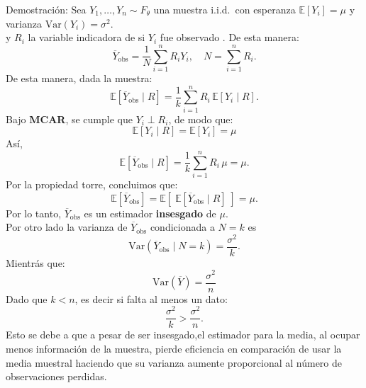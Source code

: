 \documentclass[a4paper,11pt]{article}
\begin{document}
\begin{demostracion}{Demostración:}
Sea $Y_1,\dots,Y_n \sim  F_\theta $ una muestra i.i.d.~con esperanza 
$\mathbb{E}[Y_i]=\mu$ y varianza $\mathrm{Var}(Y_i)=\sigma^2$.\\
y  $R_i$ la variable indicadora de si $Y_i$ fue observado .
De esta manera:
\[
\overline{Y}_{\text{obs}} = \frac{1}{N} \sum_{i=1}^n R_i Y_i,
\quad N=\sum_{i=1}^n R_i.
\]
De esta manera, dada la muestra:
\[
\mathbb{E}\!\left[\overline{Y}_{\text{obs}} \mid R\right]
= \frac{1}{k}\sum_{i=1}^n R_i\,\mathbb{E}[Y_i \mid R].
\]
Bajo  \textbf{MCAR}, se cumple que 
$Y_i \perp R_i$, de modo que: 
\[
\mathbb{E}[Y_i \mid R]=\mathbb{E}[Y_i]=\mu
\]
Así,
\[
\mathbb{E}\!\left[\overline{Y}_{\text{obs}} \mid R\right]
= \frac{1}{k}\sum_{i=1}^n R_i\,\mu = \mu.
\]
Por la propiedad torre, concluimos que:
\[
\mathbb{E}[\overline{Y}_{\text{obs}}] 
= \mathbb{E}\!\left[\;\mathbb{E}[\overline{Y}_{\text{obs}}\mid R]\;\right]
= \mu.
\]
Por lo tanto, $\overline{Y}_{\text{obs}}$ es un estimador \textbf{insesgado} de $\mu$.\\
Por otro lado la varianza de $\overline{Y}_{\text{obs}}$ condicionada a $N=k$ es
\[
\mathrm{Var}(\overline{Y}_{\text{obs}} \mid N=k) 
= \frac{\sigma^2}{k}.
\]
Mientrás que: 
\[
\mathrm{Var}(\overline{Y})=\dfrac{\sigma^2}{n}
\]
Dado que $k<n$, es decir si falta al menos un dato:
\[
\frac{\sigma^2}{k} > \frac{\sigma^2}{n}.
\]
Esto se debe a que a pesar de ser insesgado,el estimador para la media, al ocupar menos información de la muestra, pierde eficiencia en comparación de usar la media muestral haciendo que su varianza aumente proporcional al número de observaciones perdidas.
\end{demostracion}
\end{document}

